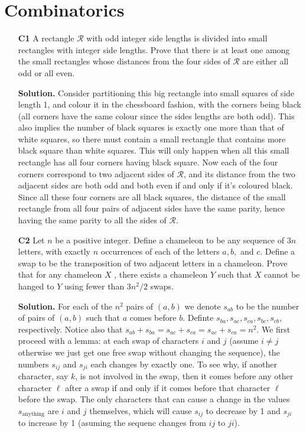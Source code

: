 \documentclass[11pt,a4paper]{article}
\begin{document}
\section{Combinatorics}
\begin{enumerate}
	\item[\textbf{C1}] A rectangle $\mathcal{R}$ with odd integer side lengths is divided into small rectangles with integer side lengths. Prove that there is at least one among the small rectangles whose distances from the four sides of $\mathcal{R}$ are either all odd or all even. 
	
	\textbf{Solution.} Consider partitioning this big rectangle into small squares of side length 1, and colour it in the chessboard fashion, with the corners being black (all corners have the same colour since the sides lengths are both odd). This also implies the number of black squares is exactly one more than that of white squares, so there must contain a small rectangle that contains more black square than white squares. This will only happen when all this small rectangle has all four corners having black square. Now each of the four corners correspond to two adjacent sides of $\mathcal{R}$, and its distance from the two adjacent sides are both odd and both even if and only if it's coloured black. Since all these four corners are all black squares, the distance of the small rectangle from all four pairs of adjacent sides have the same parity, hence having the same parity to all the sides of $\mathcal{R}$. 
	
	\item[\textbf{C2}] Let $n$ be a positive integer. Define a chameleon to be any sequence of $3n$ letters, with exactly $n$ occurrences of each of the letters $a, b,$ and $c$. Define a swap to be the transposition of two adjacent letters in a chameleon. Prove that for any chameleon $X$ , there exists a chameleon $Y$ such that $X$ cannot be hanged to $Y$ using fewer than $3n^2/2$ swaps.
	
	\textbf{Solution.} For each of the $n^2$ pairs of $(a, b)$ we denote $s_{ab}$ to be the number of pairs of $(a, b)$ such that $a$ comes before $b$. Definte $s_{ba}, s_{ac}, s_{ca}, s_{bc}, s_{cb}$, respectively. Notice also that $s_{ab}+s_{ba}=s_{ac} + s_{ca}= s_{ac} + s_{ca} = n^2$. We first proceed with a lemma: at each swap of characters $i$ and $j$ (assume $i\neq j$ otherwise we just get one free swap without changing the sequence), the numbers $s_{ij}$ and $s_{ji}$ each changes by exactly one. To see why, if another character, say $k$, is not involved in the swap, then it comes before any other character $\ell$ after a swap if and only if it comes before that character $\ell$ before the swap. The only characters that can cause a change in the values $s_{\text{anything}}$ are $i$ and $j$ themselves, which will cause $s_{ij}$ to decrease by 1 and $s_{ji}$ to increase by 1 (asuming the sequenc changes from $ij$ to $ji$). 
	

\end{enumerate}
\end{document}
